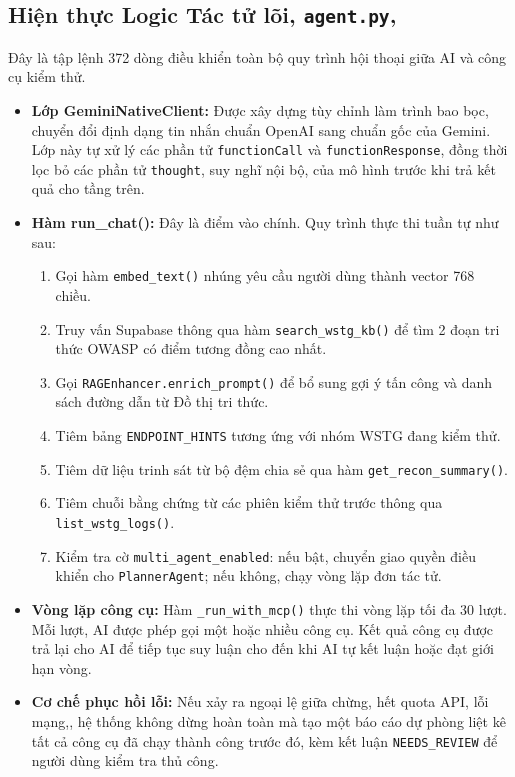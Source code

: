 \subsection{Hiện thực Logic Tác tử lõi, \texttt{agent.py},}
Đây là tập lệnh 372 dòng điều khiển toàn bộ quy trình hội thoại giữa AI và công cụ kiểm thử.
\begin{itemize}
    \item \textbf{Lớp GeminiNativeClient:} Được xây dựng tùy chỉnh làm trình bao bọc, chuyển đổi định dạng tin nhắn chuẩn OpenAI sang chuẩn gốc của Gemini. Lớp này tự xử lý các phần tử \texttt{functionCall} và \texttt{functionResponse}, đồng thời lọc bỏ các phần tử \texttt{thought}, suy nghĩ nội bộ, của mô hình trước khi trả kết quả cho tầng trên.
    \item \textbf{Hàm run\_chat():} Đây là điểm vào chính. Quy trình thực thi tuần tự như sau:
    \begin{enumerate}
        \item Gọi hàm \texttt{embed\_text()} nhúng yêu cầu người dùng thành vector 768 chiều.
        \item Truy vấn Supabase thông qua hàm \texttt{search\_wstg\_kb()} để tìm 2 đoạn tri thức OWASP có điểm tương đồng cao nhất.
        \item Gọi \texttt{RAGEnhancer.enrich\_prompt()} để bổ sung gợi ý tấn công và danh sách đường dẫn từ Đồ thị tri thức.
        \item Tiêm bảng \texttt{ENDPOINT\_HINTS} tương ứng với nhóm WSTG đang kiểm thử.
        \item Tiêm dữ liệu trinh sát từ bộ đệm chia sẻ qua hàm \texttt{get\_recon\_summary()}.
        \item Tiêm chuỗi bằng chứng từ các phiên kiểm thử trước thông qua \texttt{list\_wstg\_logs()}.
        \item Kiểm tra cờ \texttt{multi\_agent\_enabled}: nếu bật, chuyển giao quyền điều khiển cho \texttt{PlannerAgent}; nếu không, chạy vòng lặp đơn tác tử.
    \end{enumerate}
    \item \textbf{Vòng lặp công cụ:} Hàm \texttt{\_run\_with\_mcp()} thực thi vòng lặp tối đa 30 lượt. Mỗi lượt, AI được phép gọi một hoặc nhiều công cụ. Kết quả công cụ được trả lại cho AI để tiếp tục suy luận cho đến khi AI tự kết luận hoặc đạt giới hạn vòng.
    \item \textbf{Cơ chế phục hồi lỗi:} Nếu xảy ra ngoại lệ giữa chừng, hết quota API, lỗi mạng,, hệ thống không dừng hoàn toàn mà tạo một báo cáo dự phòng liệt kê tất cả công cụ đã chạy thành công trước đó, kèm kết luận \texttt{NEEDS\_REVIEW} để người dùng kiểm tra thủ công.
\end{itemize}


